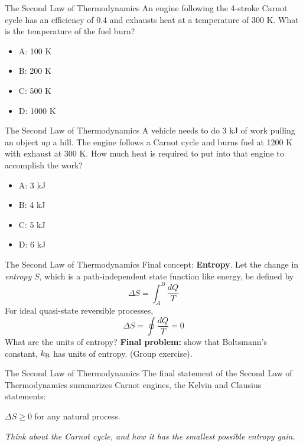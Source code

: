 \documentclass{beamer}
\begin{document}
\begin{frame}{The Second Law of Thermodynamics}
An engine following the 4-stroke Carnot cycle has an efficiency of 0.4 and exhausts heat at a temperature of 300 K.  What is the temperature of the fuel burn?
\begin{itemize}
\item A: 100 K
\item B: 200 K
\item C: 500 K
\item D: 1000 K
\end{itemize}
\end{frame}

\begin{frame}{The Second Law of Thermodynamics}
A vehicle needs to do 3 kJ of work pulling an object up a hill.  The engine follows a Carnot cycle and burns fuel at 1200 K with exhaust at 300 K.  How much heat is required to put into that engine to accomplish the work?
\begin{itemize}
\item A: 3 kJ
\item B: 4 kJ
\item C: 5 kJ
\item D: 6 kJ
\end{itemize}
\end{frame}

\begin{frame}{The Second Law of Thermodynamics}
Final concept: \textbf{Entropy}.  Let the change in \textit{entropy} $S$, which is a path-independent state function like energy, be defined by
\begin{equation}
\Delta S = \int_{A}^B \frac{dQ}{T}
\end{equation}
For ideal quasi-state reversible processes,
\begin{equation}
\Delta S = \oint \frac{dQ}{T} = 0
\end{equation}
What are the units of entropy?  \textbf{Final problem:} show that Boltsmann's constant, $k_{\rm B}$ has units of entropy. (Group exercise).
\end{frame}

\begin{frame}{The Second Law of Thermodynamics}
The final statement of the Second Law of Thermodynamics summarizes Carnot engines, the Kelvin and Clausius statements:
\\ \vspace{0.5cm}
\begin{tcolorbox}[colback=white,colframe=red!40!blue,title=The \textit{Entropy Statement} of the Second Law of Thermodynamics]
\alert{$\Delta S \geq 0$ for any natural process.}
\end{tcolorbox}
\vspace{0.5cm}
\textit{Think about the Carnot cycle, and how it has the smallest possible entropy gain.}
\end{frame}
\end{document}
